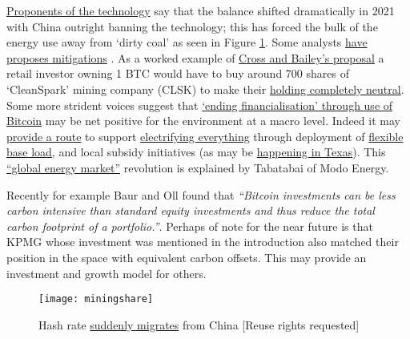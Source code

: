 \href{https://electricmoney.org/}{Proponents of the technology} say that the balance shifted dramatically in 2021 with China outright banning the technology; this has forced the bulk of the energy use away from `dirty coal' as seen in Figure \ref{fig:miningshare}. Some analysts \href{https://docs.google.com/document/d/1N2N-5jY00cmteoY_puWI9oosM1foa4EQqsO1FFfIFR4/edit}{have proposes mitigations} \cite{cross2021greening}. As a worked example of \href{https://docs.google.com/spreadsheets/d/15e_a-D3x4fv3tglEzFmQ6TLQx0fZe6-iKO9Fc9SyISQ/edit#gid=0}{Cross and Bailey's proposal} a retail investor owning 1 BTC would have to buy around 700 shares of `CleanSpark' mining company (CLSK) to make their \href{https://docs.google.com/spreadsheets/d/1r32T8p_PHTP8S781u7PhPSwehLx2VcJTaJJKesMswD0/edit#gid=0}{holding completely neutral}.  Some more strident voices suggest that \href{https://medium.com/@magusperivallon/a-financial-hail-mary-for-the-climate-an-argument-for-bitcoin-adoption-9c58e707d0}{`ending financialisation' through use of Bitcoin} may be net positive for the environment at a macro level. Indeed it may \href{https://www.newsweek.com/bitcoin-mining-americas-most-misunderstood-industry-opinion-1669892}{provide a route} to support \href{https://mobile.twitter.com/DSBatten/status/1514072998881665027}{electrifying everything} through deployment of \href{https://lancium.com/solutions/}{flexible base load}, and local subsidy initiatives (as may be \href{https://braiins.com/blog/bitcoin-mining-the-grid-generators}{happening in Texas})\cite{griffith2021electrify, ercotimpact2021}. This \href{https://www.citadel21.com/bitcoin-is-the-first-global-market-for-electricity-and-will-unleash-renewables}{``global energy market''} revolution is explained by Tabatabai of Modo Energy.\par Recently for example Baur and Oll found that \textit{``Bitcoin investments can be less carbon intensive than standard equity investments and thus reduce the total carbon footprint of a portfolio.''}\cite{baur2021bitcoin}. Perhaps of note for the near future is that KPMG whose investment was mentioned in the introduction also matched their position in the space with equivalent  carbon offsets. This may provide an investment and growth model for others.
\begin{figure}
  \centering
    \texttt{[image: miningshare]}
  \caption{Hash rate \href{https://ccaf.io/cbeci/ining_map}{suddenly migrates} from China [Reuse rights requested]}
  \label{fig:miningshare}
\end{figure}
